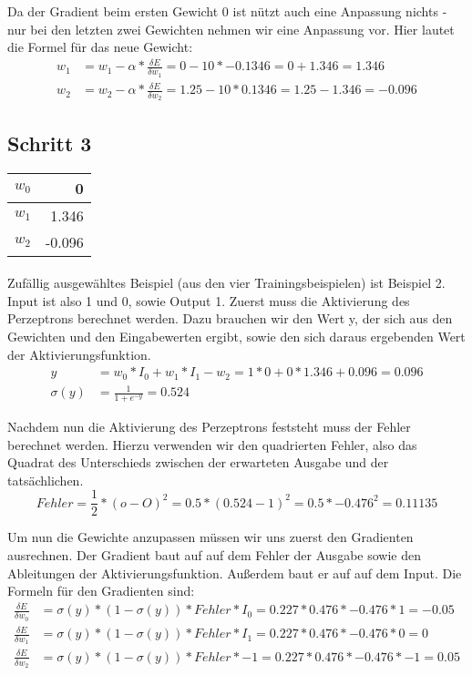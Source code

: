 \documentclass[a4paper]{article}
\begin{document}
Da der Gradient beim ersten Gewicht 0 ist nützt auch eine Anpassung nichts - nur bei den letzten zwei Gewichten nehmen wir eine Anpassung vor. Hier lautet die Formel für das neue Gewicht:
\begin{align*}
	w_1 &= w_1 - \alpha * \frac{\delta E}{\delta w_1} = 0 - 10 * -0.1346 = 0 + 1.346 = 1.346 \\
	w_2 &= w_2 - \alpha * \frac{\delta E}{\delta w_2} = 1.25 - 10 * 0.1346 = 1.25 - 1.346 = -0.096
\end{align*}

\subsection{Schritt 3}
\begin{tabular}{|l|r|}
	\hline
	$w_0$ & 0 \\\hline
	$w_1$ & 1.346 \\\hline
	$w_2$ & -0.096 \\\hline
\end{tabular}
\paragraph{}
Zufällig ausgewähltes Beispiel (aus den vier Trainingsbeispielen) ist Beispiel 2. Input ist also 1 und 0, sowie Output 1.
Zuerst muss die Aktivierung des Perzeptrons berechnet werden. Dazu brauchen wir den Wert y, der sich aus den Gewichten und den Eingabewerten ergibt, sowie den sich daraus ergebenden Wert der Aktivierungsfunktion.
\begin{align*}
	y &= w_0 * I_0 + w_1 * I_1 - w_2 = 1 * 0 + 0 * 1.346 + 0.096 = 0.096 \\
	\sigma(y) &= \frac{1}{1 + e^{-y}} = 0.524
\end{align*}

Nachdem nun die Aktivierung des Perzeptrons feststeht muss der Fehler berechnet werden. Hierzu verwenden wir den quadrierten Fehler, also das Quadrat des Unterschieds zwischen der erwarteten Ausgabe und der tatsächlichen.
\[
	Fehler = \frac{1}{2} * (o - O)^2 = 0.5 * (0.524 - 1)^2 = 0.5 * -0.476^2 = 0.11135
\]

Um nun die Gewichte anzupassen müssen wir uns zuerst den Gradienten ausrechnen.
Der Gradient baut auf auf dem Fehler der Ausgabe sowie den Ableitungen der Aktivierungsfunktion. Außerdem baut er auf auf dem Input. Die Formeln für den Gradienten sind:
\begin{align*}
	\frac{\delta E}{\delta w_0} &= \sigma(y) * (1 - \sigma(y)) * Fehler * I_0 = 0.227 * 0.476 * -0.476 * 1 = -0.05 \\
	\frac{\delta E}{\delta w_1} &= \sigma(y) * (1 - \sigma(y)) * Fehler * I_1 = 0.227 * 0.476 * -0.476 * 0 = 0 \\
	\frac{\delta E}{\delta w_2} &= \sigma(y) * (1 - \sigma(y)) * Fehler * -1 = 0.227 * 0.476 * -0.476 * -1 = 0.05
\end{align*}
\end{document}
